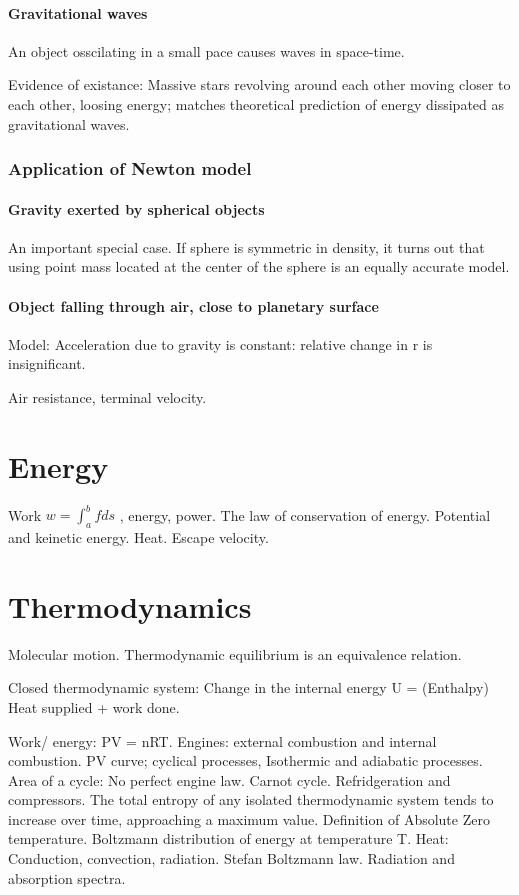 \documentclass{article}
\begin{document}
\paragraph*{Gravitational waves}
An object osscilating in a small pace causes waves in space-time.

Evidence of existance: Massive stars revolving around each other moving closer to each other, loosing energy; matches theoretical prediction of energy dissipated as gravitational waves.

\subsubsection{Application of Newton model}
\paragraph*{Gravity exerted by spherical objects}
An important special case. If sphere is symmetric in density, it turns out that using point mass located at the center of the sphere is an equally accurate model.

\paragraph*{Object falling through air, close to planetary surface}
Model: Acceleration due to gravity is constant: relative change in r is insignificant.

Air resistance, terminal velocity.

\section{Energy}
Work $w = \int_{a}^{b}fds$ , energy, power. The law of conservation of energy. Potential and keinetic energy. Heat. Escape velocity.

\section{Thermodynamics}
Molecular motion. Thermodynamic equilibrium is an equivalence relation.

Closed thermodynamic system: Change in the internal energy U = (Enthalpy) Heat supplied + work done.

Work/ energy: PV = nRT. Engines: external combustion and internal combustion. PV curve; cyclical processes, Isothermic and adiabatic processes. Area of a cycle: No perfect engine law. Carnot cycle. Refridgeration and compressors. The total entropy of any isolated thermodynamic system tends to increase over time, approaching a maximum value. Definition of Absolute Zero temperature. Boltzmann distribution of energy at temperature T. Heat: Conduction, convection, radiation. Stefan Boltzmann law. Radiation and absorption spectra.
\end{document}
